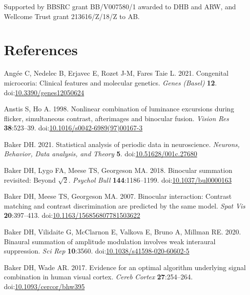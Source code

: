 \documentclass[
]{article}
\newlength{\cslhangindent}
\newlength{\cslentryspacingunit} %
\newenvironment{CSLReferences}[2] %
 {%
  \setlength{\parindent}{0pt}
  \ifodd #1
  \let\oldpar\par
  \def\par{\hangindent=\cslhangindent\oldpar}
  \fi
  \setlength{\parskip}{#2\cslentryspacingunit}
 }%
 {}
\begin{document}
Supported by BBSRC grant BB/V007580/1 awarded to DHB and ARW, and Wellcome Trust grant 213616/Z/18/Z to AB.

\hypertarget{references}{%
\section*{References}\label{references}}

\hypertarget{refs}{}
\begin{CSLReferences}{1}{0}
\leavevmode{}%
Angée C, Nedelec B, Erjavec E, Rozet J-M, Fares Taie L. 2021. Congenital microcoria: Clinical features and molecular genetics. \emph{Genes (Basel)} \textbf{12}. doi:\href{https://doi.org/10.3390/genes12050624}{10.3390/genes12050624}

\leavevmode{}%
Anstis S, Ho A. 1998. Nonlinear combination of luminance excursions during flicker, simultaneous contrast, afterimages and binocular fusion. \emph{Vision Res} \textbf{38}:523--39. doi:\href{https://doi.org/10.1016/s0042-6989(97)00167-3}{10.1016/s0042-6989(97)00167-3}

\leavevmode{}%
Baker DH. 2021. Statistical analysis of periodic data in neuroscience. \emph{Neurons, Behavior, Data analysis, and Theory} \textbf{5}. doi:\href{https://doi.org/10.51628/001c.27680}{10.51628/001c.27680}

\leavevmode{}%
Baker DH, Lygo FA, Meese TS, Georgeson MA. 2018. Binocular summation revisited: Beyond \(\sqrt{2}\). \emph{Psychol Bull} \textbf{144}:1186--1199. doi:\href{https://doi.org/10.1037/bul0000163}{10.1037/bul0000163}

\leavevmode{}%
Baker DH, Meese TS, Georgeson MA. 2007. Binocular interaction: Contrast matching and contrast discrimination are predicted by the same model. \emph{Spat Vis} \textbf{20}:397--413. doi:\href{https://doi.org/10.1163/156856807781503622}{10.1163/156856807781503622}

\leavevmode{}%
Baker DH, Vilidaite G, McClarnon E, Valkova E, Bruno A, Millman RE. 2020. Binaural summation of amplitude modulation involves weak interaural suppression. \emph{Sci Rep} \textbf{10}:3560. doi:\href{https://doi.org/10.1038/s41598-020-60602-5}{10.1038/s41598-020-60602-5}

\leavevmode{}%
Baker DH, Wade AR. 2017. Evidence for an optimal algorithm underlying signal combination in human visual cortex. \emph{Cereb Cortex} \textbf{27}:254--264. doi:\href{https://doi.org/10.1093/cercor/bhw395}{10.1093/cercor/bhw395}


\end{CSLReferences}
\end{document}
